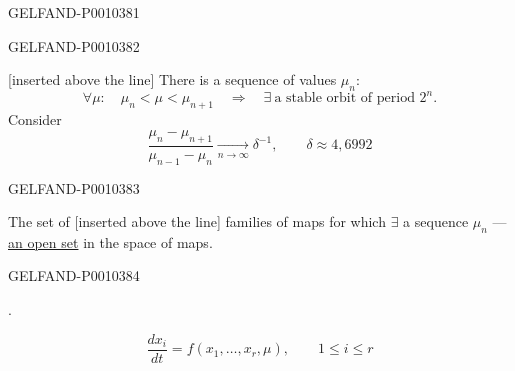 \begin{GelfandAdjacentEvidence}{GELFAND-P001038}{1}
\end{GelfandAdjacentEvidence}
\begin{GelfandAdjacentEvidence}{GELFAND-P001038}{2}

[inserted above the line] There is a sequence of values $\mu_n$:
\begin{equation*}
\forall\mu:\quad \mu_n<\mu<\mu_{n+1}\quad\Rightarrow\quad
\exists\ \text{a stable orbit of period }2^n.
\tag{1}
\end{equation*}
Consider
\begin{equation*}
\frac{\mu_n-\mu_{n+1}}{\mu_{n-1}-\mu_n}
\underset{n\to\infty}{\longrightarrow}\delta^{-1},\qquad
\delta\approx4{,}6992
\tag{2}
\end{equation*}
\end{GelfandAdjacentEvidence}
\begin{GelfandAdjacentEvidence}{GELFAND-P001038}{3}


The set of [inserted above the line] families of maps for which $\exists$ a sequence $\mu_n$ ---
\underline{an open set} in the space of maps.
\end{GelfandAdjacentEvidence}
\begin{GelfandAdjacentEvidence}{GELFAND-P001038}{4}


.

\begin{equation*}
\frac{dx_i}{dt}=f(x_1,\ldots,x_r,\mu),\qquad1\le i\le r
\tag{3}
\end{equation*}
\end{GelfandAdjacentEvidence}
